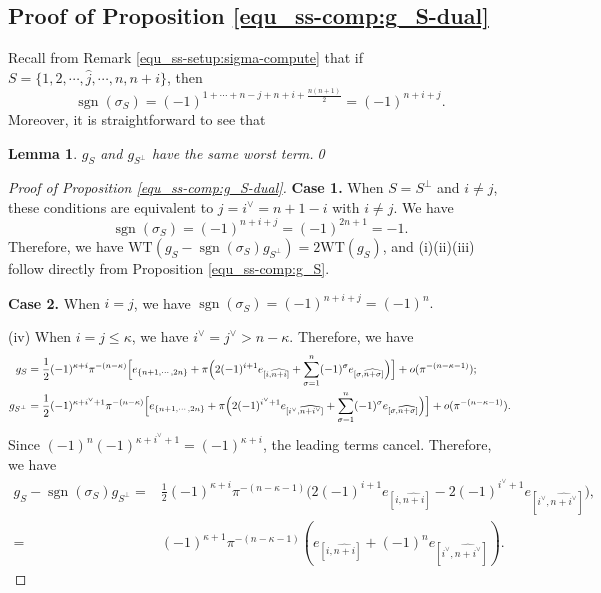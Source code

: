 \documentclass[pdflatex,sn-mathphys-num]{sn-jnl}%
\theoremstyle{thmstyleone}%
\newtheorem{lemma}[subsubsection]{Lemma}%
\theoremstyle{thmstyletwo}%
\numberwithin{equation}{subsection}
\theoremstyle{thmstylethree}%
\DeclareMathOperator{\sgn}{sgn}
\newcommand{\wh}{\widehat}
\newcommand{\WT}{\text{WT}}
\begin{document}
\subsection{Proof of Proposition \ref{equ_ss-comp:g_S-dual}}\label{Appendix_second-proof}
Recall from Remark \ref{equ_ss-setup:sigma-compute} that if $S=\{1,2,\cdots,\hat{j},\cdots,n,n+i\}$, then
\begin{equation*}
	\sgn(\sigma_S)=(-1)^{1+\cdots+n-j+n+i+\frac{n(n+1)}{2}}=(-1)^{n+i+j}.
\end{equation*}
Moreover, it is straightforward to see that
\begin{lemma}\label{equ_ss-comp:dual}
	$g_S$ and $g_{S^\perp}$ have the same worst term.\qed
\end{lemma}
\begin{proof}[Proof of Proposition \ref{equ_ss-comp:g_S-dual}]\hfill

\bigskip
\noindent\textbf{Case 1.} When $S=S^\perp$ and $i\neq j$, these conditions are equivalent to
$j=i^\vee=n+1-i$ with $i\neq j$. 
We have
\[
	\sgn(\sigma_S)=(-1)^{n+i+j}=(-1)^{2n+1}=-1.
\]
Therefore, we have $\WT(g_S-\sgn(\sigma_S)g_{S^\perp})=2\WT(g_S)$, and (i)(ii)(iii) follow directly from Proposition \ref{equ_ss-comp:g_S}.
			
\bigskip		
\noindent\textbf{Case 2.} When $i=j$,
we have $\sgn(\sigma_S)=(-1)^{n+i+j}=(-1)^n.$

\noindent (iv) When $i=j\leq \kappa$, we have $i^\vee=j^\vee>n-\kappa$. Therefore, we have
\begin{align*}
g_S={}&\frac{1}{2}(-1)^{\kappa+i}\pi^{-(n-\kappa)}\Bigl[e_{\{n+1,\cdots,2n\}}
+\pi\Bigl(
2(-1)^{i+1}e_{[i,\wh{n+i}]}+\sum_{\sigma=1}^n(-1)^\sigma e_{[\sigma,\wh{n+\sigma}]}
\Bigr)\Bigr]+o(\pi^{-(n-\kappa-1)});\\
g_{S^\perp}={}&\frac{1}{2}(-1)^{\kappa+i^\vee+1}\pi^{-(n-\kappa)}\Bigl[e_{\{n+1,\cdots,2n\}}
+\pi\Bigl(
2(-1)^{i^\vee+1} e_{[i^\vee,\wh{n+i^\vee}]}+\sum_{\sigma=1}^n(-1)^\sigma e_{[\sigma,\wh{n+\sigma}]}
\Bigr)\Bigr]+o(\pi^{-(n-\kappa-1)}).\\
\end{align*}
Since $(-1)^n(-1)^{\kappa+i^\vee+1}=(-1)^{\kappa+i}$, the leading terms cancel. 
Therefore, we have
\begin{align*}
	g_S-\sgn(\sigma_S)g_{S^\perp}
	={} &\frac{1}{2}(-1)^{\kappa+i}\pi^{-(n-\kappa-1)}\biggl(
	2(-1)^{i+1}e_{[i,\wh{n+i}]}-2(-1)^{i^\vee+1} e_{[i^\vee,\wh{n+i^\vee}]}\biggr),\\
	={} & (-1)^{\kappa+1}\pi^{-(n-\kappa-1)}\left(e_{[i,\wh{n+i}]}+(-1)^ne_{[i^\vee,\wh{n+i^\vee}]}\right).
\end{align*}	


\end{proof}
\end{document}
